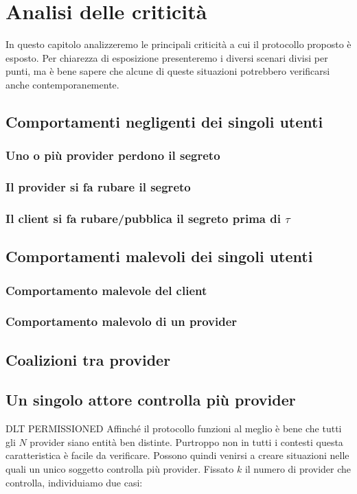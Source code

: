 \chapter{Analisi delle criticità}
\label{chap:analisi-attacchi}
In questo capitolo analizzeremo le principali criticità a cui il protocollo
proposto è esposto. Per chiarezza di esposizione presenteremo
i diversi scenari divisi per punti, ma è bene
sapere che alcune di queste situazioni potrebbero verificarsi anche contemporanemente.

\section{Comportamenti negligenti dei singoli utenti}
\subsection{Uno o più provider perdono il segreto}


\subsection{Il provider si fa rubare il segreto}

\subsection{Il client si fa rubare/pubblica il segreto prima di $ \tau $}


\section{Comportamenti malevoli dei singoli utenti}
\subsection{Comportamento malevole del client}

\subsection{Comportamento malevolo di un provider}


\section{Coalizioni tra provider}


\section{Un singolo attore controlla più provider}
DLT PERMISSIONED
Affinché il protocollo funzioni al meglio
è bene che tutti gli $ N $ provider
siano entità ben distinte. Purtroppo non in tutti i contesti
questa caratteristica è facile da verificare.
Possono quindi venirsi a creare situazioni nelle quali un unico soggetto controlla
più provider. Fissato $ k $ il numero di provider che controlla,
individuiamo due casi:
